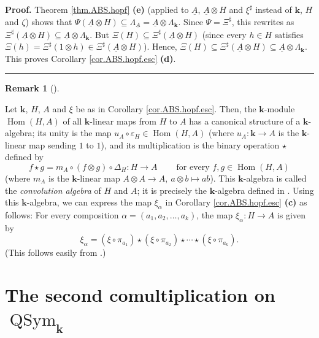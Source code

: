 \documentclass
[numbers=enddot,12pt,final,onecolumn,notitlepage,abstracton]{scrartcl}%
\theoremstyle{definition}
\newtheorem{remk}[theo]{Remark}
\newenvironment{remark}[1][]
{\begin{remk}[#1]\begin{leftbar}}
{\end{leftbar}\end{remk}}
\newenvironment{proof}[1][Proof]{\noindent\textbf{#1.} }{\ \rule{0.5em}{0.5em}}
\begin{document}
\begin{proof}
Theorem \ref{thm.ABS.hopf} \textbf{(e)} (applied to $\underline{A}$,
$\underline{A}\otimes H$ and $\xi^{\sharp}$ instead of $\mathbf{k}$, $H$ and
$\zeta$) shows that $\Psi\left(  \underline{A}\otimes H\right)  \subseteq
\Lambda_{\underline{A}}=\underline{A}\otimes\Lambda_{\mathbf{k}}$. Since
$\Psi=\Xi^{\sharp}$, this rewrites as $\Xi^{\sharp}\left(  \underline{A}%
\otimes H\right)  \subseteq\underline{A}\otimes\Lambda_{\mathbf{k}}$. But
$\Xi\left(  H\right)  \subseteq\Xi^{\sharp}\left(  \underline{A}\otimes
H\right)  $ (since every $h\in H$ satisfies $\Xi\left(  h\right)  =\Xi
^{\sharp}\left(  1\otimes h\right)  \in\Xi^{\sharp}\left(  \underline{A}%
\otimes H\right)  $). Hence, $\Xi\left(  H\right)  \subseteq\Xi^{\sharp
}\left(  \underline{A}\otimes H\right)  \subseteq\underline{A}\otimes
\Lambda_{\mathbf{k}}$. This proves Corollary \ref{cor.ABS.hopf.esc}
\textbf{(d)}.
\end{proof}

\begin{remark}
\label{rmk.xi1.convolution}Let $\mathbf{k}$, $H$, $A$ and $\xi$ be as in
Corollary \ref{cor.ABS.hopf.esc}. Then, the $\mathbf{k}$-module
$\operatorname*{Hom}\left(  H,A\right)  $ of all $\mathbf{k}$-linear maps from
$H$ to $A$ has a canonical structure of a $\mathbf{k}$-algebra; its unity is
the map $u_{A}\circ\varepsilon_{H}\in\operatorname*{Hom}\left(  H,A\right)  $
(where $u_{A}:\mathbf{k}\rightarrow A$ is the $\mathbf{k}$-linear map sending
$1$ to $1$), and its multiplication is the binary operation $\star$ defined by%
\[
f\star g=m_{A}\circ\left(  f\otimes g\right)  \circ\Delta_{H}:H\rightarrow
A\ \ \ \ \ \ \ \ \ \ \text{for every }f,g\in\operatorname*{Hom}\left(
H,A\right)
\]
(where $m_{A}$ is the $\mathbf{k}$-linear map $A\otimes A\rightarrow
A,\ a\otimes b\mapsto ab$). This $\mathbf{k}$-algebra is called the
\textit{convolution algebra} of $H$ and $A$; it is precisely the $\mathbf{k}%
$-algebra defined in \cite[Definition 1.4.1]{Reiner}. Using this $\mathbf{k}%
$-algebra, we can express the map $\xi_{\alpha}$ in Corollary \ref{cor.ABS.hopf.esc}
\textbf{(c)} as follows: For every composition $\alpha=\left(  a_{1}%
,a_{2},\ldots,a_{k}\right)  $, the map $\xi_{\alpha}:H\rightarrow A$ is given
by%
\[
\xi_{\alpha}=\left(  \xi\circ\pi_{a_{1}}\right)  \star\left(  \xi\circ
\pi_{a_{2}}\right)  \star\cdots\star\left(  \xi\circ\pi_{a_{k}}\right)  .
\]
(This follows easily from \cite[Exercise 1.4.23]{Reiner}.)
\end{remark}

\section{The second comultiplication on $\operatorname*{QSym}%
\nolimits_{\mathbf{k}}$}
\end{document}
